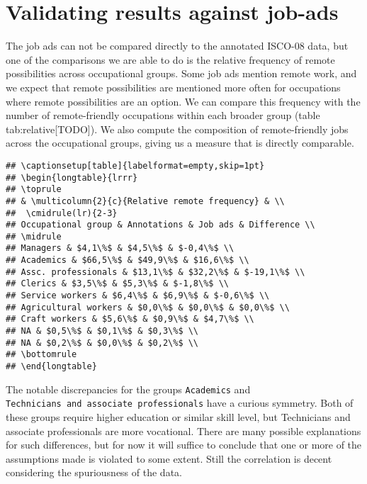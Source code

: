 \documentclass[11pt,]{article}
\begin{document}
\hypertarget{validating-results-against-job-ads}{%
\section{Validating results against
job-ads}\label{validating-results-against-job-ads}}

The job ads can not be compared directly to the annotated ISCO-08 data,
but one of the comparisons we are able to do is the relative frequency
of remote possibilities across occupational groups. Some job ads mention
remote work, and we expect that remote possibilities are mentioned more
often for occupations where remote possibilities are an option. We can
compare this frequency with the number of remote-friendly occupations
within each broader group (table tab:relative{[}TODO{]}). We also
compute the composition of remote-friendly jobs across the occupational
groups, giving us a measure that is directly comparable.

\begin{verbatim}
## \captionsetup[table]{labelformat=empty,skip=1pt}
## \begin{longtable}{lrrr}
## \toprule
## & \multicolumn{2}{c}{Relative remote frequency} & \\ 
##  \cmidrule(lr){2-3}
## Occupational group & Annotations & Job ads & Difference \\ 
## \midrule
## Managers & $4,1\%$ & $4,5\%$ & $-0,4\%$ \\ 
## Academics & $66,5\%$ & $49,9\%$ & $16,6\%$ \\ 
## Assc. professionals & $13,1\%$ & $32,2\%$ & $-19,1\%$ \\ 
## Clerics & $3,5\%$ & $5,3\%$ & $-1,8\%$ \\ 
## Service workers & $6,4\%$ & $6,9\%$ & $-0,6\%$ \\ 
## Agricultural workers & $0,0\%$ & $0,0\%$ & $0,0\%$ \\ 
## Craft workers & $5,6\%$ & $0,9\%$ & $4,7\%$ \\ 
## NA & $0,5\%$ & $0,1\%$ & $0,3\%$ \\ 
## NA & $0,2\%$ & $0,0\%$ & $0,2\%$ \\ 
## \bottomrule
## \end{longtable}
\end{verbatim}

The notable discrepancies for the groups \texttt{Academics} and
\texttt{Technicians\ and\ associate\ professionals} have a curious
symmetry. Both of these groups require higher education or similar skill
level, but Technicians and associate professionals are more vocational.
There are many possible explanations for such differences, but for now
it will suffice to conclude that one or more of the assumptions made is
violated to some extent. Still the correlation is decent considering the
spuriousness of the data.
\end{document}
